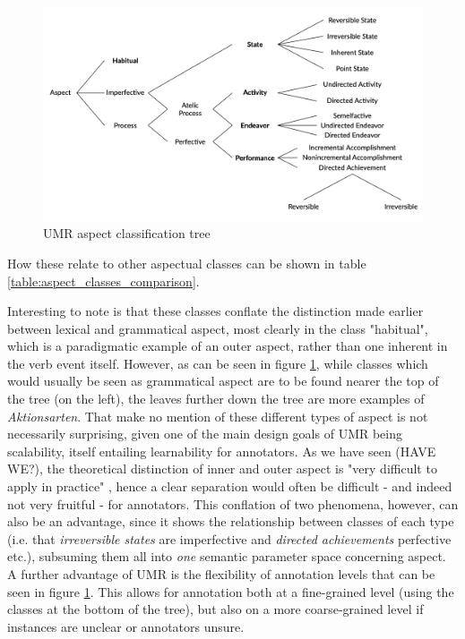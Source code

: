 \begin{figure}
    \includegraphics[width=\textwidth]{img/umr_aspct_tree.png}
    \caption{UMR aspect classification tree \citep{umrslides2022}}
    \label{fig:umr_aspect_tree}
\end{figure}

How these relate to other aspectual classes can be shown in table \ref{table:aspect_classes_comparison}.

Interesting to note is that these classes conflate the distinction made earlier between lexical and grammatical aspect, most clearly in the class "habitual", which is a paradigmatic example of an outer aspect, rather than one inherent in the verb event itself. However, as can be seen in figure \ref{fig:umr_aspect_tree}, while classes which would usually be seen as grammatical aspect are to be found nearer the top of the tree (on the left), the leaves further down the tree are more examples of \emph{Aktionsarten}. That \citet{umr} make no mention of these different types of aspect is not necessarily surprising, given one of the main design goals of UMR being scalability, itself entailing learnability for annotators. As we have seen (HAVE WE?), the theoretical distinction of inner and outer aspect is "very difficult to apply in practice" \citep{Dahl1985TenseAA}, hence a clear separation would often be difficult - and indeed not very fruitful - for annotators. This conflation of two phenomena, however, can also be an advantage, since it shows the relationship between classes of each type (i.e. that \emph{irreversible states} are imperfective and \emph{directed achievements} perfective etc.), subsuming them all into \emph{one} semantic parameter space concerning aspect. A further advantage of UMR is the flexibility of annotation levels that can be seen in figure \ref{fig:umr_aspect_tree}. This allows for annotation both at a fine-grained level (using the classes at the bottom of the tree), but also on a more coarse-grained level if instances are unclear or annotators unsure.

